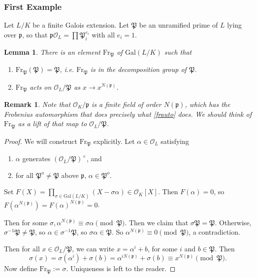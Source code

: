 \documentclass[letterpaper, 12pt]{article}
\newtheorem{rmk}{Remark}
\newtheorem{lem}[thm]{Lemma}
\newcommand{\roi}[1]{\mathcal{O}_{#1}}
\newcommand{\gal}[3]{\mathrm{Gal}(#1 #2 #3)}
\renewcommand{\prime}{\mathfrak{p}}
\newcommand{\oprime}{\mathfrak{P}}
\newcommand{\oprimealt}{\oprime^o}
\newcommand{\frob}[1]{\mathrm{Fr}_{#1}}
\newcommand{\N}[1]{N(#1)}
\begin{document}
\subsubsection{First Example}
Let $L/K$ be a finite Galois extension. Let $\oprime$ be an unramified prime of $L$ lying over $\prime$, so that $\prime \roi L = \prod \oprime_i^{e_i}$ with all $e_i = 1$.
\begin{lem}
There is an element $\frob \oprime$ of $\gal L/K$ such that
\begin{enumerate}[1)]
\item $\frob \oprime (\oprime) = \oprime$, i.e. $\frob \oprime$ is in the decomposition group of $\oprime$.
\item \label{frauto} $\frob \oprime$ acts on $\roi L / \oprime$ as $x \rightarrow x^{N(\prime)}$.
\end{enumerate}
\end{lem}
\begin{rmk}
Note that $\roi K / \prime$ is a finite field of order $N(\prime)$, which has the Frobenius automorphism that does precisely what \ref{frauto} does. We should think of $\frob \oprime$ as a lift of that map to $\roi L/\oprime$. 
\end{rmk}

\begin{proof}
We will construct $\frob \oprime$ explicitly. Let $\alpha \in \roi L$ satisfying
\begin{enumerate}
\item $\alpha$ generates $(\roi L/\oprime)^{\times}$, and
\item for all $\oprimealt \neq \oprime$ above $\prime$, $\alpha \in \oprimealt$.
\end{enumerate}

Set $F(X) = \displaystyle \prod_{\sigma \in \gal L/K} (X - \sigma \alpha) \in \roi K[X].$ Then $F(\alpha) = 0$, so $F(\alpha^{\N \prime}) = F(\alpha)^{\N \prime} = 0$.

Then for some $\sigma, \alpha^{\N \prime} \equiv \sigma \alpha \pmod \oprime$. Then we claim that $\sigma \oprime = \oprime$. Otherwise, $\sigma^{-1} \oprime \neq \oprime$, so $\alpha \in \sigma^{-1} \oprime$, so $\sigma \alpha \in \oprime$. So $\alpha^{\N \prime} \equiv 0 \pmod \oprime$, a contradiction. 

Then for all $x \in \roi L / \oprime$, we can write $x = \alpha^i + b$, for some $i$ and $b \in \oprime$. Then \[\sigma(x) = \sigma(\alpha^i) + \sigma(b) = \alpha^{i \N \prime} + \sigma(b) \equiv x^{\N \prime} \pmod \oprime.\] Now define $\frob \oprime := \sigma$. Uniqueness is left to the reader. 
\end{proof}
\end{document}
